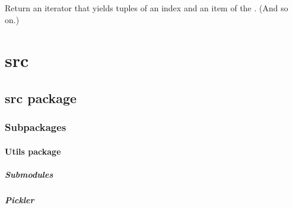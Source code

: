 \documentclass[letterpaper,10pt,english]{sphinxmanual}
\begin{document}

\begin{fulllineitems}
\label{\detokenize{index:enumerate}}
Return an iterator that yields tuples of an index and an item of the
. (And so on.)

\end{fulllineitems}



\chapter{src}
\label{\detokenize{index:src}}

\section{src package}
\label{\detokenize{src:src-package}}\label{\detokenize{src::doc}}

\subsection{Subpackages}
\label{\detokenize{src:subpackages}}

\subsubsection{Utils package}
\label{\detokenize{src.Utils:utils-package}}\label{\detokenize{src.Utils::doc}}

\paragraph{Submodules}
\label{\detokenize{src.Utils:submodules}}

\paragraph{Pickler}
\label{\detokenize{src.Utils:module-src.Utils.Pickler}}\label{\detokenize{src.Utils:pickler}}

\begin{fulllineitems}
\label{\detokenize{src.Utils:src.Utils.Pickler.pickle_data}}
\end{fulllineitems}
\end{document}
